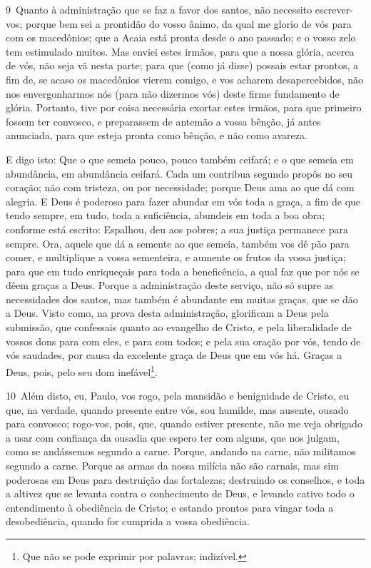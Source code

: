 \medskip

\lettrine{9}\ Quanto à administração que se faz a favor dos
santos, não necessito escrever-vos; porque bem sei a prontidão
do vosso ânimo, da qual me glorio de vós para com os macedônios; que
a Acaia está pronta desde o ano passado; e o vosso zelo tem
estimulado muitos. Mas enviei estes irmãos, para que a nossa
glória, acerca de vós, não seja vã nesta parte; para que (como já
disse) possais estar prontos, a fim de, se acaso os macedônios
vierem comigo, e vos acharem desapercebidos, não nos envergonharmos
nós (para não dizermos vós) deste firme fundamento de glória.
Portanto, tive por coisa necessária exortar estes irmãos, para
que primeiro fossem ter convosco, e preparassem de antemão a vossa
bênção, já antes anunciada, para que esteja pronta como bênção, e
não como avareza.

E digo isto: Que o que semeia pouco, pouco também ceifará; e o que
semeia em abundância, em abundância ceifará. Cada um contribua
segundo propôs no seu coração; não com tristeza, ou por necessidade;
porque Deus ama ao que dá com alegria. E Deus é poderoso para
fazer abundar em vós toda a graça, a fim de que tendo sempre, em
tudo, toda a suficiência, abundeis em toda a boa obra; conforme
está escrito: Espalhou, deu aos pobres; a sua justiça permanece para
sempre. Ora, aquele que dá a semente ao que semeia, também
vos dê pão para comer, e multiplique a vossa sementeira, e aumente
os frutos da vossa justiça; para que em tudo enriqueçais para
toda a beneficência, a qual faz que por nós se dêem graças a Deus.
Porque a administração deste serviço, não só supre as
necessidades dos santos, mas também é abundante em muitas graças,
que se dão a Deus. Visto como, na prova desta administração,
glorificam a Deus pela submissão, que confessais quanto ao evangelho
de Cristo, e pela liberalidade de vossos dons para com eles, e para
com todos; e pela sua oração por vós, tendo de vós saudades,
por causa da excelente graça de Deus que em vós há. Graças a
Deus, pois, pelo seu dom inefável\footnote{Que não se pode exprimir
por palavras; indizível.}.

\medskip

\lettrine{10}\ Além disto, eu, Paulo, vos rogo, pela mansidão e
benignidade de Cristo, eu que, na verdade, quando presente entre
vós, sou humilde, mas ausente, ousado para convosco; rogo-vos,
pois, que, quando estiver presente, não me veja obrigado a usar com
confiança da ousadia que espero ter com alguns, que nos julgam, como
se andássemos segundo a carne. Porque, andando na carne, não
militamos segundo a carne. Porque as armas da nossa milícia não
são carnais, mas sim poderosas em Deus para destruição das
fortalezas; destruindo os conselhos, e toda a altivez que se
levanta contra o conhecimento de Deus, e levando cativo todo o
entendimento à obediência de Cristo; e estando prontos para
vingar toda a desobediência, quando for cumprida a vossa obediência.

